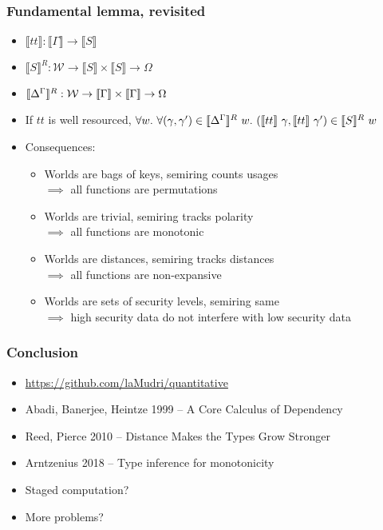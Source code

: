\documentclass{beamer}
\begin{document}
  \begin{frame}
    \frametitle{Fundamental lemma, revisited}
    \begin{itemize}
    \item $\llbracket tt \rrbracket : \llbracket \Gamma \rrbracket \to
      \llbracket S \rrbracket$ \pause
    \item $\llbracket S \rrbracket^R : \mathcal{W} \to
      \llbracket S \rrbracket \times \llbracket S \rrbracket \to \Omega$
    \item $\llbracket {\Delta}^{\Gamma} \rrbracket^R : \mathcal{W} \to
      \llbracket \Gamma \rrbracket \times \llbracket \Gamma \rrbracket \to \Omega$ \pause
    \item If $tt$ is well resourced, $\forall w.~\forall(\gamma, \gamma') \in \llbracket {\Delta}^{\Gamma}
      \rrbracket^R~w.~(\llbracket tt \rrbracket~\gamma, \llbracket tt
      \rrbracket~\gamma') \in \llbracket S \rrbracket^R~w$ \pause
    \item Consequences:
      \begin{itemize}
      \item Worlds are bags of keys, semiring counts usages \\
        $\implies$ all functions are permutations
      \item Worlds are trivial, semiring tracks polarity \\
        $\implies$ all functions are monotonic \pause
      \item Worlds are distances, semiring tracks distances \\
        $\implies$ all functions are non-expansive \pause
      \item Worlds are sets of security levels, semiring same \\
        $\implies$ high security data do not interfere with low security data
      \end{itemize}
    \end{itemize}
  \end{frame}
  \begin{frame}
    \frametitle{Conclusion}
    \begin{itemize}
    \item \url{https://github.com/laMudri/quantitative} \pause
    \item Abadi, Banerjee, Heintze 1999 -- A Core Calculus of Dependency
    \item Reed, Pierce 2010 -- Distance Makes the Types Grow Stronger
    \item Arntzenius 2018 -- Type inference for monotonicity \pause
    \item Staged computation?
    \item More problems?
    \end{itemize}
  \end{frame}
\end{document}
